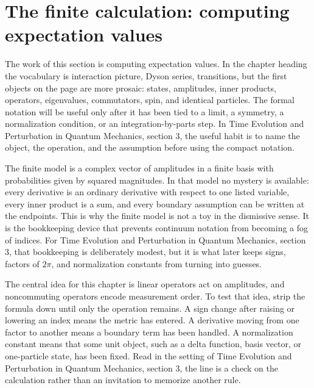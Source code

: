 \section{The finite calculation: computing expectation values}













The work of this section is computing expectation values.  In the chapter heading the vocabulary is interaction picture, Dyson series, transitions, but the first objects on the page are more prosaic: states, amplitudes, inner products, operators, eigenvalues, commutators, spin, and identical particles.  The formal notation will be useful only after it has been tied to a limit, a symmetry, a normalization condition, or an integration-by-parts step.  In Time Evolution and Perturbation in Quantum Mechanics, section 3, the useful habit is to name the object, the operation, and the assumption before using the compact notation.

The finite model is a complex vector of amplitudes in a finite basis with probabilities given by squared magnitudes.  In that model no mystery is available: every derivative is an ordinary derivative with respect to one listed variable, every inner product is a sum, and every boundary assumption can be written at the endpoints.  This is why the finite model is not a toy in the dismissive sense.  It is the bookkeeping device that prevents continuum notation from becoming a fog of indices.  For Time Evolution and Perturbation in Quantum Mechanics, section 3, that bookkeeping is deliberately modest, but it is what later keeps signs, factors of \(2\pi\), and normalization constants from turning into guesses.

The central idea for this chapter is linear operators act on amplitudes, and noncommuting operators encode measurement order.  To test that idea, strip the formula down until only the operation remains.  A sign change after raising or lowering an index means the metric has entered.  A derivative moving from one factor to another means a boundary term has been handled.  A normalization constant means that some unit object, such as a delta function, basis vector, or one-particle state, has been fixed.  Read in the setting of Time Evolution and Perturbation in Quantum Mechanics, section 3, the line is a check on the calculation rather than an invitation to memorize another rule.

